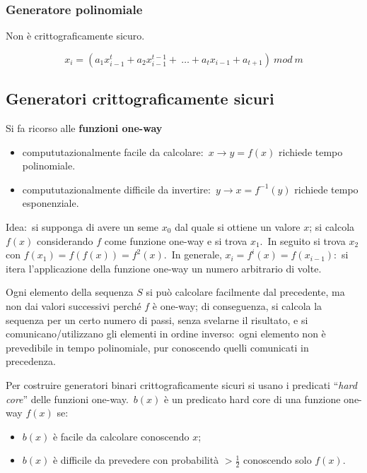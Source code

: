 \subsubsection{Generatore polinomiale}

Non è crittograficamente sicuro.\

\[x_i = (a_1 x_{i-1}^t + a_2 x_{i-1}^{t-1} +\ \dots + a_t x_{i-1} + a_{t+1})\ \mathit{mod}\ m\]

\subsection{Generatori crittograficamente sicuri}

Si fa ricorso alle \textbf{funzioni one-way}

\begin{itemize}
    \item compututazionalmente facile da calcolare:\ $x\rightarrow y=f(x)$ richiede tempo polinomiale.
    \item compututazionalmente difficile da invertire:\ $y\rightarrow x=f^{-1}(y)$ richiede tempo esponenziale.
\end{itemize}

\noindent Idea:\ si supponga di avere un seme $x_0$ dal quale si ottiene un valore $x$; si calcola $f(x)$ considerando $f$ come funzione one-way e si trova $x_1$.\
In seguito si trova $x_2$ con $f(x_1)=f(f(x))=f^2(x)$.\
In generale, $x_i = f^i(x) = f(x_{i-1})$:\ si itera l'applicazione della funzione one-way un numero arbitrario di volte.\

Ogni elemento della sequenza $S$ si può calcolare facilmente dal precedente, ma non dai valori successivi perché $f$ è one-way; di conseguenza, si calcola la sequenza per un certo numero di passi, senza svelarne il risultato, e si comunicano/utilizzano gli elementi in ordine inverso:\ ogni elemento non è prevedibile in tempo polinomiale, pur conoscendo quelli comunicati in precedenza.\

Per costruire generatori binari crittograficamente sicuri si usano i predicati ``\textit{hard core}'' delle funzioni one-way.\
$b(x)$ è un predicato hard core di una funzione one-way $f(x)$ se:\
\begin{itemize}
    \item $b(x)$ è facile da calcolare conoscendo $x$;
    \item $b(x)$ è difficile da prevedere con probabilità $> \frac{1}{2}$ conoscendo solo $f(x)$.
\end{itemize}

